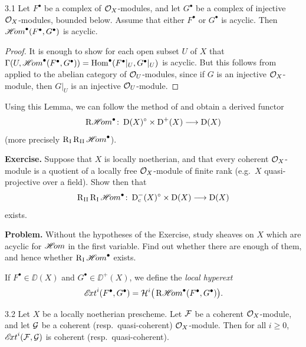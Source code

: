 \begin{booklemma}{3.1}\label{lem:2.3.1}
Let $F^\bullet$ be a complex of $\mathcal{O}_X$-modules, and let $G^\bullet$ be a complex of injective $\mathcal{O}_X$-modules, bounded below. Assume that either $F^\bullet$ or $G^\bullet$ is acyclic. Then $\mathop{\mathscr{H}\!om}\nolimits^\bullet(F^\bullet,G^\bullet)$ is acyclic.
\end{booklemma}

\begin{proof}
It is enough to show for each open subset $U$ of $X$ that
$\Gamma(U,\mathop{\mathscr{H}\!om}\nolimits^\bullet(F^\bullet,G^\bullet)) = \operatorname{Hom}^\bullet(F^\bullet|_U, G^\bullet|_U)$ is acyclic. But this follows from  applied to the abelian category of $\mathcal{O}_U$-modules, since if $G$ is an injective $\mathcal{O}_X$-module, then $G|_U$ is an injective $\mathcal{O}_U$-module.
\end{proof}

Using this Lemma, we can follow the method of  and obtain a derived functor
\[
\mathop{\mathrm{R}\mathscr{H}\!om}\nolimits^\bullet\colon \operatorname{D}(X)^\circ \times \operatorname{D}^+(X) \longrightarrow \operatorname{D}(X)
\]
(more precisely $\operatorname{R}_{\mathrm{I}}\operatorname{R}_{\mathrm{II}}\mathop{\mathscr{H}\!om}\nolimits^\bullet$).

\textbf{Exercise.}
Suppose that $X$ is locally noetherian, and that every coherent $\mathcal{O}_X$-module is a quotient of a locally free $\mathcal{O}_X$-module of finite rank (e.g.\ $X$ quasi-projective over a field). Show then that
\[
\operatorname{R}_{\mathrm{II}}\operatorname{R}_{\mathrm{I}}\mathop{\mathscr{H}\!om}\nolimits^\bullet\colon \operatorname{D}_{\mathrm{c}}^-(X)^\circ \times \operatorname{D}(X) \longrightarrow \operatorname{D}(X)
\]
exists.

\medskip

\textbf{Problem.}
Without the hypotheses of the Exercise, study sheaves on $X$ which are acyclic for $\mathop{\mathscr{H}\!om}\nolimits$ in the first variable. Find out whether there are enough of them, and hence whether $\operatorname{R}_{\mathrm{I}}\mathop{\mathscr{H}\!om}\nolimits^\bullet$ exists.

\begin{definition*}
If $F^\bullet\in\DD(X)$ and $G^\bullet\in\DD^+(X)$, we define the \emph{local hyperext}
\[
\mathop{\mathscr{E}\!xt}\nolimits^i(F^\bullet,G^\bullet) = \mathcal{H}^i\big(\mathop{\mathrm{R}\mathscr{H}\!om}\nolimits^\bullet(F^\bullet,G^\bullet)\big).
\]
\end{definition*}

\begin{booklemma}{3.2}\label{lem:2.3.2}
	Let
	$X$
	be a locally noetherian prescheme. Let $\mathcal{F}$ be a coherent $\mathcal{O}_X$-module, and let $\mathcal{G}$ be a coherent (resp.\ quasi-coherent) $\mathcal{O}_X$-module. Then for all $i\ge 0$, $\mathop{\mathscr{E}\!xt}\nolimits^i(\mathcal{F},\mathcal{G})$ is coherent (resp.\ quasi-coherent).
\end{booklemma}


